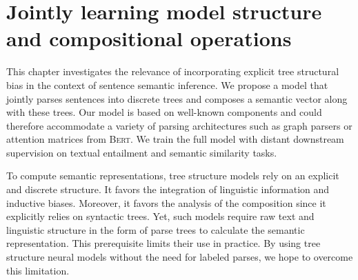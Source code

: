 \setchapterpreamble[u]{\margintoc}
\chapter{Jointly learning model structure and compositional operations}


This chapter investigates the relevance of incorporating explicit tree structural bias in the context of sentence semantic inference. We propose a model that jointly parses sentences into discrete trees and composes a semantic vector along with these trees. Our model is based on well-known components and could therefore accommodate a variety of parsing architectures such as graph parsers or attention matrices from \textsc{Bert}. We train the full model with distant downstream supervision on textual entailment and semantic similarity tasks. 


To compute semantic representations, tree structure models rely on an explicit and discrete structure. It favors the integration of linguistic information and inductive biases. Moreover, it favors the analysis of the composition since it explicitly relies on syntactic trees. Yet, such models require raw text and linguistic structure in the form of parse trees to calculate the semantic representation. This prerequisite limits their use in practice. By using tree structure neural models without the need for labeled parses, we hope to overcome this limitation.



